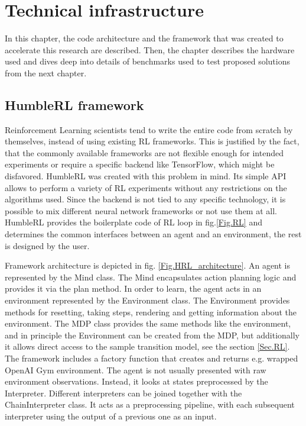 \section{Technical infrastructure}

In this chapter, the code architecture and the framework that was created to accelerate this research are described. Then, the chapter describes the hardware used and dives deep into details of benchmarks used to test proposed solutions from the next chapter.

\subsection{HumbleRL framework}

Reinforcement Learning scientists tend to write the entire code from scratch by themselves, instead of using existing RL frameworks. This is justified by the fact, that the commonly available frameworks are not flexible enough for intended experiments or require a specific backend like TensorFlow, which might be disfavored.
HumbleRL \cite{Code.HRL} was created with this problem in mind. Its simple API allows to perform a variety of RL experiments without any restrictions on the algorithms used. Since the backend is not tied to any specific technology, it is possible to mix different neural network frameworks or not use them at all. HumbleRL provides the boilerplate code of RL loop in fig.\ref{Fig.RL} and determines the common interfaces between an agent and an environment, the rest is designed by the user.

Framework architecture is depicted in fig. \ref{Fig.HRL_architecture}. An agent is represented by the Mind class. The Mind encapsulates action planning logic and provides it via the plan method. In order to learn, the agent acts in an environment represented by the Environment class. The Environment provides methods for resetting, taking steps, rendering and getting information about the environment. The MDP class provides the same methods like the environment, and in principle the Environment can be created from the MDP, but additionally it allows direct access to the sample transition model, see the section \ref{Sec.RL}. \\
The framework includes a factory function that creates and returns e.g. wrapped OpenAI Gym environment. The agent is not usually presented with raw environment observations. Instead, it looks at states preprocessed by the Interpreter. Different interpreters can be joined together with the ChainInterpreter class. It acts as a preprocessing pipeline, with each subsequent interpreter using the output of a previous one as an input.

